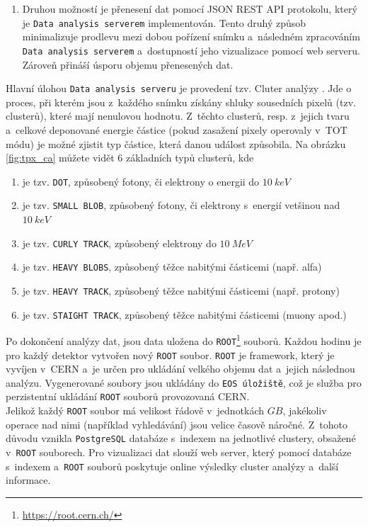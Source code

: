 \begin{description}
\begin{enumerate}
			\item Druhou možností je přenesení dat pomocí JSON REST API protokolu, který je \texttt{Data analysis serverem} implementován. Tento druhý způsob minimalizuje prodlevu mezi dobou pořízení snímku a~následném zpracováním \texttt{Data analysis serverem} a~dostupností jeho vizualizace pomocí web serveru. Zároveň přináší úsporu objemu přenesených dat.
		\end{enumerate}
		Hlavní úlohou \texttt{Data analysis serveru} je provedení tzv. Cluter analýzy \cite{Holy2008287}. Jde o proces, při kterém jsou z~každého snímku získány shluky sousedních pixelů (tzv. clusterů), které mají nenulovou hodnotu. Z~těchto clusterů, resp. z~jejich tvaru a~celkové deponované energie částice (pokud zasažení pixely operovaly v~TOT módu) je možné zjistit typ částice, která danou událost způsobila. Na obrázku \ref{fig:tpx_ca} můžete vidět 6 základních typů clusterů, kde
		 \begin{enumerate}[label=(\alph*)]
			\item je tzv. \texttt{DOT}, způsobený fotony, či elektrony o energii do $10~keV$
			\item je tzv. \texttt{SMALL BLOB}, způsobený fotony, či elektrony s~energií vetšinou nad $10~keV$
			\item je tzv. \texttt{CURLY TRACK}, způsobený elektrony do $10~MeV$
			\item je tzv. \texttt{HEAVY BLOBS}, způsobený těžce nabitými částicemi (např. alfa)
			\item je tzv. \texttt{HEAVY TRACK}, způsobený těžce nabitými částicemi (např. protony)
			\item je tzv. \texttt{STAIGHT TRACK}, způsobený těžce nabitými částicemi (muony apod.)
		\end{enumerate}
		Po dokončení analýzy dat, jsou data uložena do \texttt{ROOT}\footnote{\url{https://root.cern.ch/}} souborů. Každou hodinu je pro každý detektor vytvořen nový \texttt{ROOT} soubor. \texttt{ROOT} je framework, který je vyvíjen v~CERN a~je určen pro ukládání velkého objemu dat a~jejich následnou analýzu. Vygenerované soubory jsou ukládány do \texttt{EOS úložiště}, což je služba pro perzistentní ukládání \texttt{ROOT} souborů provozovaná CERN.\\
		Jelikož každý \texttt{ROOT} soubor má velikost řádově v~jednotkách $GB$, jakékoliv operace nad nimi (například vyhledávání) jsou velice časově náročné. Z~tohoto důvodu vznikla \texttt{PostgreSQL} databáze s~indexem na jednotlivé clustery, obsažené v~\texttt{ROOT} souborech. 
		Pro vizualizaci dat slouží web server, který pomocí databáze s~indexem a~\texttt{ROOT} souborů poskytuje online výsledky cluster analýzy a~další informace.
\end{description}

